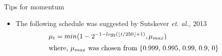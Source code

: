 \begin{frame}
	\begin{overlayarea}{\textwidth}{\textheight}
		\begin{block}{Tips for momentum}
			\begin{itemize}\justifying
				\item The following schedule was suggested by Sutskever \textit{et. al.}, 2013
				      \begin{align*}
				      	\mu_t = min (1 - 2^{-1 - log_2(\lfloor {t/250} \rfloor + 1)}, \mu_{max})      \\
				      	\intertext{where, $\mu_{max}$ was chosen from \{0.999, 0.995, 0.99, 0.9, 0\}} 
				      \end{align*}
			\end{itemize}
		\end{block}
	\end{overlayarea}
\end{frame}
